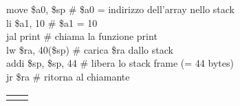 \documentclass[../main.tex]{subfiles}
\begin{document}
\begin{table}[h!]
\begin{minipage}{.75\linewidth}
{            \hspace*{0cm} \hspace*{0cm} move \$a0, \$sp \# \$a0 = indirizzo dell'array nello stack \\
            \hspace*{0cm} \hspace*{0cm} li \$a1, 10 \hspace*{0cm} \hspace*{0cm} \hspace*{0cm} \# \$a1 = 10 \\
            \hspace*{0cm} \hspace*{0cm} jal print \hspace*{0cm} \hspace*{0cm} \hspace*{0cm} \hspace*{0cm} \# chiama la funzione print \\
            \hspace*{0cm} \hspace*{0cm} lw \$ra, 40(\$sp) \hspace*{0cm} \hspace*{0cm} \# carica \$ra dallo stack \\
            \hspace*{0cm} \hspace*{0cm} addi \$sp, \$sp, 44 \# libera lo stack frame (= 44 bytes) \\
            \hspace*{0cm} \hspace*{0cm} jr \$ra \hspace*{0cm} \hspace*{0cm} \hspace*{0cm} \hspace*{0cm} \hspace*{0cm} \hspace*{0cm} \hspace*{0cm} \hspace*{0cm} \hspace*{0cm} \hspace*{0cm} \hspace*{0cm} \# ritorna al chiamante \\
        }
    \end{minipage}
    \begin{minipage}{.2\linewidth}
        \begin{tabular}{ | c | r }
            \cline{1-1}
            \\ \\

\end{tabular}
\end{minipage}
\end{table}
\end{document}
